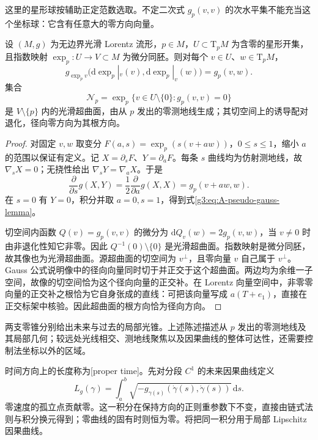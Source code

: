 这里的星形球按辅助正定范数选取。不定二次式 \(g_p(v,v)\) 的次水平集不能充当这个坐标球：它含有任意大的零方向向量。

\begin{proposition}\label{g3:prop:A-exponential-light-cone}
	设 \((M,g)\) 为无边界光滑 Lorentz 流形，\(p\in M\)，\(U\subset\mathrm T_pM\) 为含零的星形开集，且指数映射 \(\exp_p:U\to V\subset M\) 为微分同胚。则对每个 \(v\in U\)、\(w\in\mathrm T_pM\)，
	\begin{equation}\label{g3:eq:A-pseudo-gauss-lemma}
		g_{\exp_pv}\bigl(\mathrm d\exp_p|_v(v),
		                     \mathrm d\exp_p|_v(w)\bigr)=g_p(v,w).
	\end{equation}
	集合
	\[
		\mathcal N_p=\exp_p\{v\in U\setminus\{0\}:g_p(v,v)=0\}
	\]
	是 \(V\setminus\{p\}\) 内的光滑超曲面，由从 \(p\) 发出的零测地线生成；其切空间上的诱导配对退化，径向零方向为其根方向。
\end{proposition}
\begin{proof}
	对固定 \(v,w\) 取变分 \(F(a,s)=\exp_p(s(v+aw))\)，\(0\le s\le1\)，缩小 \(a\) 的范围以保证有定义。记 \(X=\partial_sF\)、\(Y=\partial_aF\)。每条 \(s\) 曲线均为仿射测地线，故 \(\nabla_sX=0\)；无挠性给出 \(\nabla_sY=\nabla_aX\)。于是
	\[
		\frac{\partial}{\partial s}g(X,Y)
		=\frac12\frac{\partial}{\partial a}g(X,X)
		=g_p(v+aw,w).
	\]
	在 \(s=0\) 有 \(Y=0\)，积分并取 \(a=0,s=1\)，得到式\eqref{g3:eq:A-pseudo-gauss-lemma}。

	切空间内函数 \(Q(v)=g_p(v,v)\) 的微分为
	\(\mathrm dQ_v(w)=2g_p(v,w)\)，当 \(v\ne0\) 时由非退化性知它非零。因此 \(Q^{-1}(0)\setminus\{0\}\) 是光滑超曲面。指数映射是微分同胚，故其像也为光滑超曲面。源超曲面的切空间为 \(v^\perp\)，且零向量 \(v\) 自己属于 \(v^\perp\)。Gauss 公式说明像中的径向向量同时切于并正交于这个超曲面。两边均为余维一子空间，故像的切空间恰为这个径向向量的正交补。在 Lorentz 向量空间中，非零零向量的正交补之根恰为它自身张成的直线：可把该向量写成 \(a(T+e_1)\)，直接在正交标架中核验。因此超曲面的根方向恰为径向方向。
\end{proof}

两支零锥分别给出未来与过去的局部光锥。上述陈述描述从 \(p\) 发出的零测地线及其局部几何；较远处光线相交、测地线聚焦以及因果曲线的整体可达性，还需要控制法坐标以外的区域。

\ProseParagraphBreak
时间方向上的长度称为[proper time]。先对分段 \(C^1\) 的未来因果曲线定义
\[
	L_g(\gamma)=\int_a^b
	      \sqrt{-g_{\gamma(s)}(\dot\gamma(s),\dot\gamma(s))}\,\mathrm ds.
\]
零速度的孤立点贡献零。这一积分在保持方向的正则重参数下不变，直接由链式法则与积分换元得到；零曲线的固有时则恒为零。将把同一积分用于局部 Lipschitz 因果曲线。

